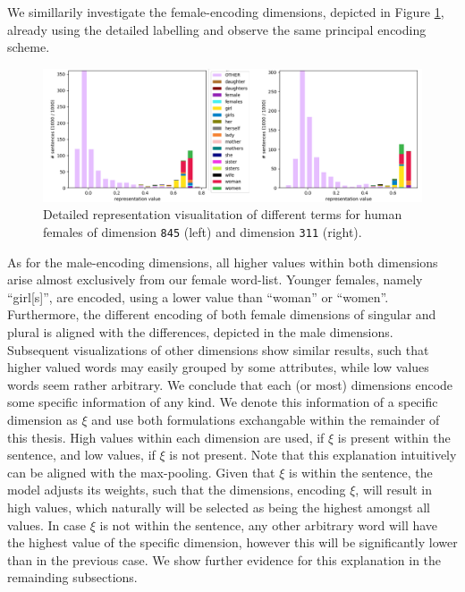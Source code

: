 \noindent
We simillarily investigate the female-encoding dimensions, depicted in Figure \ref{fig:mf_detailed_f}, already using the detailed labelling and observe the same principal encoding scheme. 
\begin{figure}[tph!]
\centering
	\includegraphics[totalheight=5cm]{fig/mf_detailed_f.png}
	\caption{Detailed representation visualitation of different terms for human females of dimension \texttt{845} (left) and dimension \texttt{311} (right).}
	\label{fig:mf_detailed_f}
\end{figure}
As for the male-encoding dimensions, all higher values within both dimensions arise almost exclusively from our female word-list. Younger females, namely ``girl[s]'', are encoded, using a lower value than ``woman'' or ``women''. Furthermore, the different encoding of both female dimensions of singular and plural is aligned with the differences, depicted in the male dimensions. Subsequent visualizations of other dimensions show similar results, such that higher valued words may easily grouped by some attributes, while low values words seem rather arbitrary. We conclude that each (or most) dimensions encode some specific information of any kind. We denote this information of a specific dimension as $\xi$ and use both formulations exchangable within the remainder of this thesis. High values within each dimension are used, if $\xi$ is present within the sentence, and low values, if $\xi$ is not present. Note that this explanation intuitively can be aligned with the max-pooling. Given that $\xi$ is within the sentence, the model adjusts its weights, such that the dimensions, encoding $\xi$, will result in high values, which naturally will be selected as being the highest amongst all values. In case $\xi$ is not within the sentence, any other arbitrary word will have the highest value of the specific dimension, however this will be significantly lower than in the previous case. We show further evidence for this explanation in the remainding subsections.

